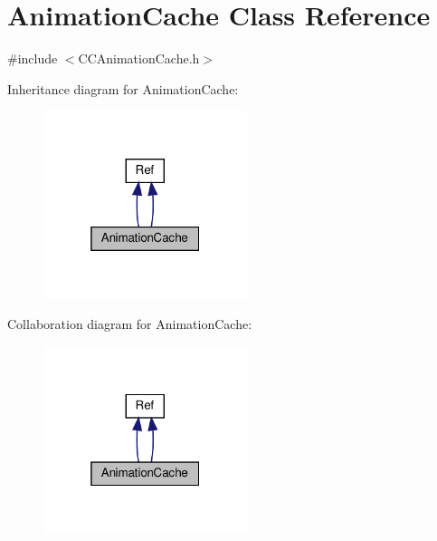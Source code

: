 \hypertarget{classAnimationCache}{}\section{Animation\+Cache Class Reference}
\label{classAnimationCache}


{\ttfamily \#include $<$C\+C\+Animation\+Cache.\+h$>$}



Inheritance diagram for Animation\+Cache\+:
\nopagebreak
\begin{figure}[H]
\begin{center}
\leavevmode
\includegraphics[width=169pt]{classAnimationCache__inherit__graph}
\end{center}
\end{figure}


Collaboration diagram for Animation\+Cache\+:
\nopagebreak
\begin{figure}[H]
\begin{center}
\leavevmode
\includegraphics[width=169pt]{classAnimationCache__coll__graph}
\end{center}
\end{figure}
